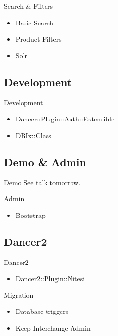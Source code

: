 \begin{frame}{Search \&  Filters}
\begin{itemize}
\item Basic Search
\item Product Filters
\item Solr
\end{itemize}
\end{frame}

\subsection{Development}
\begin{frame}{Development}
\begin{itemize}
\item Dancer::Plugin::Auth::Extensible
\item DBIx::Class
\end{itemize}
\end{frame}

\subsection{Demo \& Admin}
\begin{frame}{Demo}
See talk tomorrow.
\end{frame}

\begin{frame}{Admin}
\begin{itemize}
\item Bootstrap
\end{itemize}
\end{frame}

\subsection{Dancer2}
\begin{frame}{Dancer2}
\begin{itemize}
\item Dancer2::Plugin::Nitesi
\end{itemize}
\end{frame}

\begin{frame}{Migration}
\begin{itemize}
\item Database triggers
\item Keep Interchange Admin
\end{itemize}
\end{frame}


